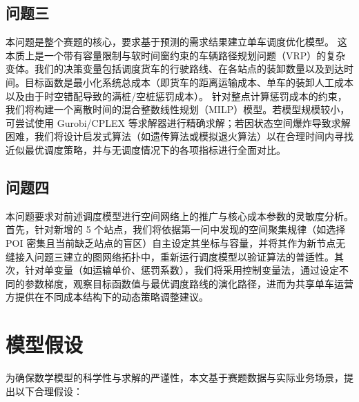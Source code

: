 \documentclass[a4paper, 12pt]{ctexart}
\begin{document}
\subsection{问题三}
本问题是整个赛题的核心，要求基于预测的需求结果建立单车调度优化模型。
这本质上是一个带有容量限制与软时间窗约束的车辆路径规划问题（VRP）的复杂变体。我们的决策变量包括调度货车的行驶路线、在各站点的装卸数量以及到达时间。目标函数是最小化系统总成本（即货车的距离运输成本、单车的装卸人工成本以及由于时空错配导致的满桩/空桩惩罚成本）。
针对整点计算惩罚成本的约束，我们将构建一个离散时间的混合整数线性规划（MILP）模型。若模型规模较小，可尝试使用 Gurobi/CPLEX 等求解器进行精确求解；若因状态空间爆炸导致求解困难，我们将设计启发式算法（如遗传算法或模拟退火算法）以在合理时间内寻找近似最优调度策略，并与无调度情况下的各项指标进行全面对比。

\subsection{问题四}
本问题要求对前述调度模型进行空间网络上的推广与核心成本参数的灵敏度分析。
首先，针对新增的 5 个站点，我们将依据第一问中发现的空间聚集规律（如选择 POI 密集且当前缺乏站点的盲区）自主设定其坐标与容量，并将其作为新节点无缝接入问题三建立的图网络拓扑中，重新运行调度模型以验证算法的普适性。其次，针对单变量（如运输单价、惩罚系数），我们将采用控制变量法，通过设定不同的参数梯度，观察目标函数值与最优调度路线的演化路径，进而为共享单车运营方提供在不同成本结构下的动态策略调整建议。

\section{模型假设}
为确保数学模型的科学性与求解的严谨性，本文基于赛题数据与实际业务场景，提出以下合理假设：
\end{document}
